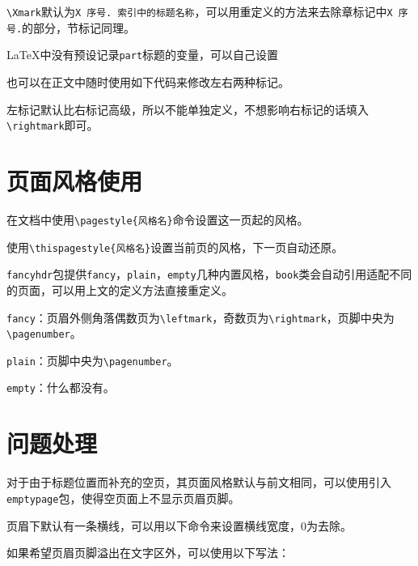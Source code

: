 \documentclass[10pt,openany]{book}
\begin{document}
\texttt{\textbackslash{}Xmark}默认为\texttt{X\ 序号.\ 索引中的标题名称}，可以用重定义的方法来去除章标记中\texttt{X\ 序号.}的部分，节标记同理。



{\LaTeX}中没有预设记录\texttt{part}标题的变量，可以自己设置



也可以在正文中随时使用如下代码来修改左右两种标记。



左标记默认比右标记高级，所以不能单独定义，不想影响右标记的话填入\texttt{\textbackslash{}rightmark}即可。

\section{页面风格使用}

在文档中使用\texttt{\textbackslash{}pagestyle\{风格名\}}命令设置这一页起的风格。

使用\texttt{\textbackslash{}thispagestyle\{风格名\}}设置当前页的风格，下一页自动还原。

\texttt{fancyhdr}包提供\texttt{fancy}，\texttt{plain}，\texttt{empty}几种内置风格，\texttt{book}类会自动引用适配不同的页面，可以用上文的定义方法直接重定义。

\texttt{fancy}：页眉外侧角落偶数页为\texttt{\textbackslash{}leftmark}，奇数页为\texttt{\textbackslash{}rightmark}，页脚中央为\texttt{\textbackslash{}pagenumber}。

\texttt{plain}：页脚中央为\texttt{\textbackslash{}pagenumber}。

\texttt{empty}：什么都没有。

\section{问题处理}

对于由于标题位置而补充的空页，其页面风格默认与前文相同，可以使用引入\texttt{emptypage}包，使得空页面上不显示页眉页脚。

页眉下默认有一条横线，可以用以下命令来设置横线宽度，0为去除。



如果希望页眉页脚溢出在文字区外，可以使用以下写法：


\end{document}
